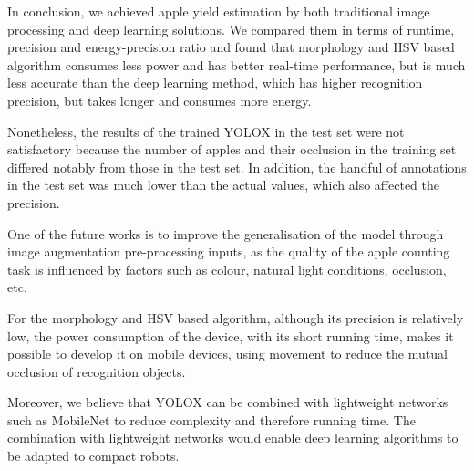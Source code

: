 In conclusion, we achieved apple yield estimation by both traditional image processing and deep learning solutions. We compared them in terms of runtime, precision and energy-precision ratio and found that morphology and HSV based algorithm consumes less power and has better real-time performance, but is much less accurate than the deep learning method, which has higher recognition precision, but takes longer and consumes more energy. 

Nonetheless, the results of the trained YOLOX in the test set were not satisfactory because the number of apples and their occlusion in the training set differed notably from those in the test set. In addition, the handful of annotations in the test set was much lower than the actual values, which also affected the precision.

One of the future works is to improve the generalisation of the model through image augmentation pre-processing inputs, as the quality of the apple counting task is influenced by factors such as colour, natural light conditions, occlusion, etc. 

For the morphology and HSV based algorithm, although its precision is relatively low, the power consumption of the device, with its short running time, makes it possible to develop it on mobile devices, using movement to reduce the mutual occlusion of recognition objects.

Moreover, we believe that YOLOX can be combined with lightweight networks such as MobileNet to reduce complexity and therefore running time. The combination with lightweight networks would enable deep learning algorithms to be adapted to compact robots.